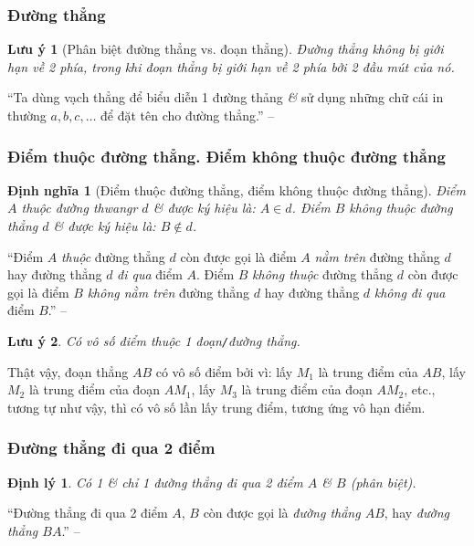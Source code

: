 \documentclass{article}
\numberwithin{equation}{section}
\newtheorem{definition}{Định nghĩa}[section]
\newtheorem{theorem}{Định lý}[section]
\newtheorem{remark}{Lưu ý}[section]
\begin{document}
\subsubsection{Đường thẳng}

\begin{remark}[Phân biệt đường thẳng vs. đoạn thẳng]
	Đường thẳng không bị giới hạn về 2 phía, trong khi đoạn thẳng bị giới hạn về 2 phía bởi 2 đầu mút của nó.
\end{remark}
``Ta dùng vạch thẳng để biểu diễn 1 đường thảng \textit{\&} sử dụng những chữ cái in thường $a,b,c,\ldots$ để đặt tên cho đường thẳng.'' -- \cite[p. 76]{Thai_Anh_Dat_Ha_Loan_Nam_Quang_Toan_6_tap_2}

\subsubsection{Điểm thuộc đường thẳng. Điểm không thuộc đường thẳng}

\begin{definition}[Điểm thuộc đường thẳng, điểm không thuộc đường thẳng]
	Điểm $A$ \emph{thuộc} đường thwangr $d$ \textit{\&} được ký hiệu là: $A\in d$. Điểm $B$ \emph{không thuộc} đường thẳng $d$ \textit{\&} được ký hiệu là: $B\notin d$.
\end{definition}
``Điểm $A$ \textit{thuộc} đường thẳng $d$ còn được gọi là điểm $A$ \textit{nằm trên} đường  thẳng $d$ hay đường thẳng $d$ \textit{đi qua} điểm $A$. Điểm $B$ \textit{không thuộc} đường thẳng $d$ còn được gọi là điểm $B$ \textit{không nằm trên} đường thẳng $d$ hay đường thẳng $d$ \textit{không đi qua} điểm $B$.'' -- \cite[p. 76]{Thai_Anh_Dat_Ha_Loan_Nam_Quang_Toan_6_tap_2}

\begin{remark}
	Có vô số điểm thuộc 1 đoạn\texttt{/}đường thẳng.
\end{remark}
Thật vậy, đoạn thẳng $AB$ có vô số điểm bởi vì: lấy $M_1$ là trung điểm của $AB$, lấy $M_2$ là trung điểm của đoạn $AM_1$, lấy $M_3$ là trung điểm của đoạn $AM_2$, etc., tương tự như vậy, thì có vô số lần lấy trung điểm, tương ứng vô hạn điểm.

\subsubsection{Đường thẳng đi qua 2 điểm}

\begin{theorem}
	Có 1 \textit{\&} chỉ 1 đường thẳng đi qua 2 điểm $A$ \textit{\&} $B$ (phân biệt).
\end{theorem}
``Đường thẳng đi qua 2 điểm $A$, $B$ còn được gọi là \textit{đường thẳng $AB$}, hay \textit{đường thẳng $BA$}.'' -- \cite[p. 77]{Thai_Anh_Dat_Ha_Loan_Nam_Quang_Toan_6_tap_2}
\end{document}
